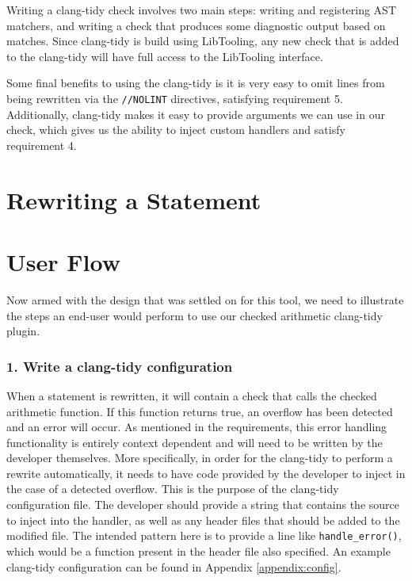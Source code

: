 Writing a clang-tidy check involves two main steps: writing and registering AST matchers, and writing a check that produces some diagnostic output based on matches. Since clang-tidy is build using LibTooling, any new check that is added to the clang-tidy will have full access to the LibTooling interface.

Some final benefits to using the clang-tidy is it is very easy to omit lines from being rewritten via the \texttt{//NOLINT} directives, satisfying requirement 5. Additionally, clang-tidy makes it easy to provide arguments we can use in our check, which gives us the ability to inject custom handlers and satisfy requirement 4.

\section{Rewriting a Statement}

\section{User Flow}

Now armed with the design that was settled on for this tool, we need to illustrate the steps an end-user would perform to use our checked arithmetic clang-tidy plugin.

\subsubsection{1. Write a clang-tidy configuration}

When a statement is rewritten, it will contain a check that calls the checked arithmetic function. If this function returns true, an overflow has been detected and an error will occur. As mentioned in the requirements, this error handling functionality is entirely context dependent and will need to be written by the developer themselves. More specifically, in order for the clang-tidy to perform a rewrite automatically, it needs to have code provided by the developer to inject in the case of a detected overflow. This is the purpose of the clang-tidy configuration file. The developer should provide a string that contains the source to inject into the handler, as well as any header files that should be added to the modified file. The intended pattern here is to provide a line like \texttt{handle\_error()}, which would be a function present in the header file also specified. An example clang-tidy configuration can be found in Appendix \ref{appendix:config}.

